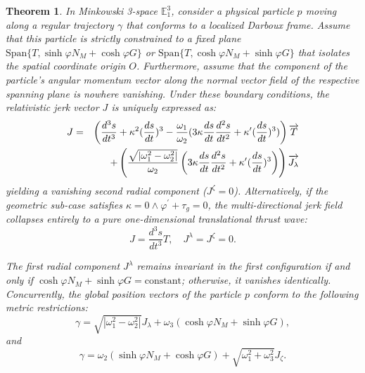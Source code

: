 \documentclass[10pt,a4paper]{amsart}
\newtheorem{theorem}{Theorem}
\begin{document}
\begin{theorem}
In Minkowski 3-space $\mathbb{E}_1^3$, consider a physical particle $p$ moving along a regular trajectory $\gamma$ that conforms to a localized Darboux frame. Assume that this particle is strictly constrained to a fixed plane $\text{Span}\{T, \sinh \varphi N_{M} + \cosh \varphi G\}$ or $\text{Span}\{T, \cosh \varphi N_{M} + \sinh \varphi G\}$ that isolates the spatial coordinate origin $O$. Furthermore, assume that the component of the particle's angular momentum vector along the normal vector field of the respective spanning plane is nowhere vanishing. Under these boundary conditions, the relativistic jerk vector $J$ is uniquely expressed as:
\begin{eqnarray*}
J &=&\left( \frac{d^{3}s}{dt^{3}}+\kappa ^{2}(\frac{ds}{dt})^{3}-\frac{%
\omega _{1}}{\omega _{2}}(3\kappa \frac{ds}{dt}\frac{d^{2}s}{dt^{2}}+\kappa
^{\prime }(\frac{ds}{dt})^{3})\right) \overrightarrow{T} \\
&&+\left( \frac{\sqrt{\vert\omega _{1}^{2}-\omega _{2}^{2}\vert}}{\omega _{2}}\left(
3\kappa \frac{ds}{dt}\frac{d^{2}s}{dt^{2}}+\kappa ^{\prime }(\frac{ds}{dt}%
)^{3}\right) \right) \overrightarrow{J_{\lambda }}
\end{eqnarray*}%
yielding a vanishing second radial component ($J^{\zeta} = 0$). Alternatively, if the geometric sub-case satisfies $\kappa = 0 \wedge \varphi^{\prime} + \tau_g = 0$, the multi-directional jerk field collapses entirely to a pure one-dimensional translational thrust wave: 
\begin{equation*}
J = \frac{d^{3}s}{dt^{3}} T, \quad J^{\lambda} = J^{\zeta} = 0.
\end{equation*}

The first radial component $J^{\lambda}$ remains invariant in the first configuration if and only if $\cosh \varphi N_{M}+\sinh \varphi G = \text{constant}$; otherwise, it vanishes identically. Concurrently, the global position vectors of the particle $p$ conform to the following metric restrictions:
\begin{equation*}
\gamma = \sqrt{\left|\omega _{1}^{2}-\omega _{2}^{2}\right|} J_{\lambda} + \omega _{3} \left( \cosh \varphi N_{M} + \sinh \varphi G \right), 
\end{equation*}
and
\begin{equation*}
\gamma = \omega _{2} \left( \sinh \varphi N_{M} + \cosh \varphi G \right) + \sqrt{\omega _{1}^{2} + \omega _{3}^{2}} J_{\zeta}. 
\end{equation*}
\end{theorem}
\end{document}

